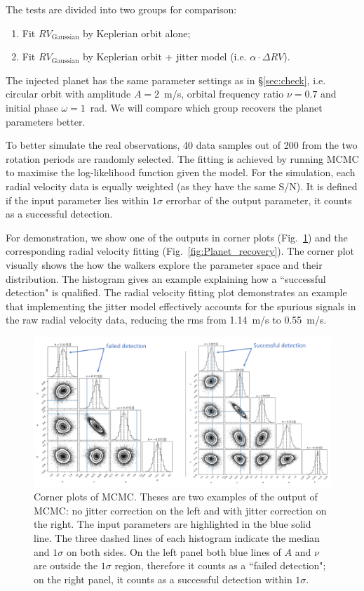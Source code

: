The tests are divided into two groups for comparison:
\begin{enumerate}
	\item Fit $RV_\text{Gaussian}$ by Keplerian orbit alone;
	\item Fit $RV_\text{Gaussian}$ by Keplerian orbit + jitter model (i.e. $\alpha \cdot \Delta RV$).
\end{enumerate}
The injected planet has the same parameter settings as in \S\ref{sec:check}, i.e. circular orbit with amplitude $A = 2$~m/s,
orbital frequency ratio $\nu = 0.7$ and initial phase $\omega = 1$~rad. We will compare which group recovers the 
planet parameters better. 

To better simulate the real observations, 40 data samples out of 200 from the two rotation periods are randomly selected.  
The fitting is achieved by running MCMC to maximise the log-likelihood function
given the model. For the simulation, each radial velocity data is equally weighted (as they have the same S/N). 
It is defined if the input parameter lies within $1\sigma$ errorbar of the output parameter, it counts as a 
successful detection. 

For demonstration, we show one of the outputs in corner plots (Fig.~\ref{fig:Corner}) and the corresponding 
radial velocity fitting (Fig.~\ref{fig:Planet_recovery}). The corner plot visually shows the how the walkers explore the parameter 
space and their distribution. The histogram gives an example explaining how a ``successful detection" is qualified. 
The radial velocity fitting plot demonstrates an example that implementing the jitter model effectively 
accounts for the spurious signals in the raw radial velocity data, reducing the rms from 1.14~m/s to 0.55~m/s. 

\begin{figure}[tbp]
\centering
\includegraphics[width = 0.99 \linewidth]
{./Figures/Methods/Corner.png}
\caption[Corner plots of MCMC]
{Corner plots of MCMC. Theses are two examples of the output of MCMC: no jitter correction on the left and 
with jitter correction on the right. The input parameters are highlighted in the 
blue solid line. The three dashed lines of each histogram indicate the median and $1\sigma$ on both sides. On the 
left panel both blue lines of $A$ and $\nu$ are outside the $1\sigma$ region, therefore it counts as a ``failed detection";
on the right panel, it counts as a successful detection within $1\sigma$.}
\label{fig:Corner}
\end{figure} 

